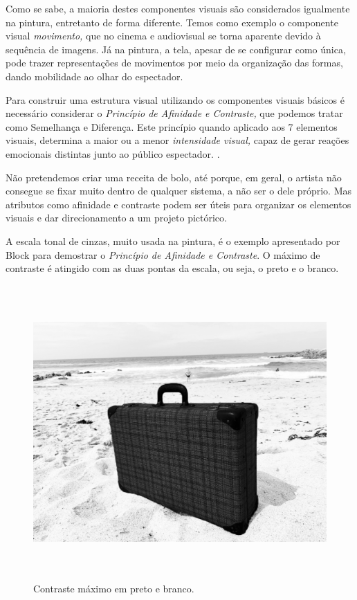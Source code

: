 Como se sabe, a maioria destes componentes visuais são considerados
igualmente na pintura, entretanto de forma diferente. Temos como
exemplo o componente visual \emph{movimento,} que no cinema e
audiovisual se torna aparente devido à sequência de imagens. Já na
pintura, a tela, apesar de se configurar como única, pode trazer
representações de movimentos por meio da organização das formas, dando
mobilidade ao olhar do espectador.

Para construir uma estrutura visual utilizando os componentes visuais
básicos é necessário considerar o \emph{Princípio de Afinidade e
	Contraste,} que podemos tratar como Semelhança e Diferença. Este
princípio quando aplicado aos 7 elementos visuais, determina a maior ou
a menor \emph{intensidade visual,} capaz de gerar reações emocionais
distintas junto ao público espectador. .

Não pretendemos criar uma receita de bolo, até porque, em geral, o
artista não consegue se fixar muito dentro de qualquer sistema, a não
ser o dele próprio. Mas atributos como afinidade e contraste podem ser
úteis para organizar os elementos visuais e dar direcionamento a um
projeto pictórico.

A escala tonal de cinzas, muito usada na pintura, é o exemplo
apresentado por Block para demostrar o \emph{Princípio de Afinidade e
	Contraste}. O máximo de contraste é atingido com as duas pontas da
escala, ou seja, o preto e o branco.

\begin{figure}
	\caption{Contraste máximo em preto e branco.}
	\includegraphics[width=5.90139in,height=4.42639in]{figuras/contraste-maximo-preto-branco.pdf.compressed.pdf}
\end{figure}

